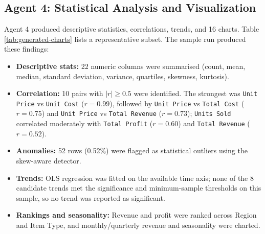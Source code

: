 \documentclass[12pt,a4paper,openany]{report}
\begin{document}
\subsection{Agent 4: Statistical Analysis and Visualization}
Agent 4 produced descriptive statistics, correlations, trends, and 16 charts. Table \ref{tab:generated-charts} lists a representative subset. The sample run produced these findings:
\begin{itemize}
	\item \textbf{Descriptive stats:} 22 numeric columns were summarised (count, mean, median, standard deviation, variance, quartiles, skewness, kurtosis).
	\item \textbf{Correlation:} 10 pairs with $|r| \ge 0.5$ were identified. The strongest was \texttt{Unit Price} vs \texttt{Unit Cost} ($r=0.99$), followed by \texttt{Unit Price} vs \texttt{Total Cost} ($r=0.75$) and \texttt{Unit Price} vs \texttt{Total Revenue} ($r=0.73$); \texttt{Units Sold} correlated moderately with \texttt{Total Profit} ($r=0.60$) and \texttt{Total Revenue} ($r=0.52$).
	\item \textbf{Anomalies:} 52 rows (0.52\%) were flagged as statistical outliers using the skew-aware detector.
	\item \textbf{Trends:} OLS regression was fitted on the available time axis; none of the 8 candidate trends met the significance and minimum-sample thresholds on this sample, so no trend was reported as significant.
	\item \textbf{Rankings and seasonality:} Revenue and profit were ranked across Region and Item Type, and monthly/quarterly revenue and seasonality were charted.
\end{itemize}
\end{document}
